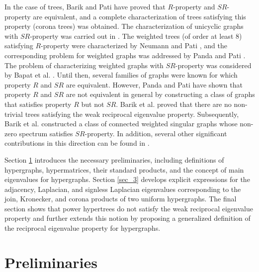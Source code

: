 \documentclass[10pt,a4paper]{article}
\begin{document}
	
	In the case of trees, Barik and Pati \cite{barik2006nonsingular} have proved that $R$-property and $SR$-property are equivalent, and a complete characterization of trees satisfying this property (corona trees) was obtained. The characterization of unicyclic graphs with $SR$-property was carried out in \cite{barik2008unicyclic}.
	The weighted trees (of order at least 8) satisfying $R$-property were characterized by Neumann and Pati \cite{neumann2013reciprocal}, and the corresponding problem for weighted graphs was addressed by Panda and Pati \cite{panda2015inverse}. 
	The problem of characterizing weighted graphs with $SR$-property was considered by Bapat et al. \cite{bapat2016strong}.
	Until then, several families of graphs were known for which property $R$ and $SR$ are equivalent. However, Panda and Pati \cite{panda2016graphs} have shown that property $R$ and $SR$ are not equivalent in general by constructing a class of graphs that satisfies property $R$ but not $SR$.
	Barik et al. \cite{barik2022trees} proved that there are no non-trivial trees satisfying the weak reciprocal eigenvalue property. Subsequently, Barik et al. \cite{barik2024singular} constructed a class of connected weighted singular graphs whose non-zero spectrum satisfies $SR$-property.
	In addition, several other significant contributions in this direction can be found in \cite{panda2017some, bapat2017self, barik2024non, liu2025classes, kadu2024reciprocal, barik2021classes, kalita2014reciprocal}.
	
	Section \ref{sec_2} introduces the necessary preliminaries, including definitions of hypergraphs, hypermatrices, their standard products, and the concept of main eigenvalues for hypergraphs.
	Section \ref{sec_3} develops explicit expressions for the adjacency, Laplacian, and signless Laplacian eigenvalues corresponding to the join, Kronecker, and corona products of two uniform hypergraphs.
	The final section shows that power hypertrees do not satisfy the weak reciprocal eigenvalue property and further extends this notion by proposing a generalized definition of the reciprocal eigenvalue property for hypergraphs.
	\section{Preliminaries}\label{sec_2}
	
\end{document}

